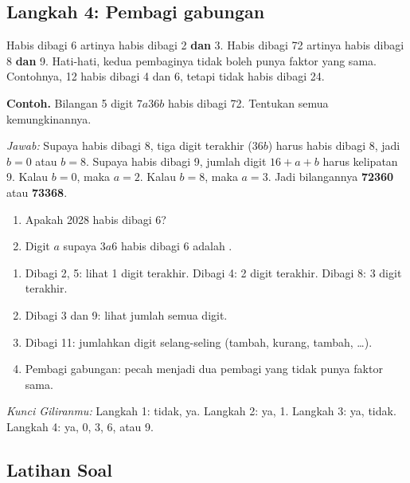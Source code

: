 \documentclass[11pt,a4paper]{article}
\begin{document}
\subsection*{Langkah 4: Pembagi gabungan}
Habis dibagi 6 artinya habis dibagi 2 \textbf{dan} 3. Habis dibagi 72 artinya habis dibagi 8
\textbf{dan} 9. Hati-hati, kedua pembaginya tidak boleh punya faktor yang sama. Contohnya, 12
habis dibagi 4 dan 6, tetapi tidak habis dibagi 24.

\begin{contoh}
\textbf{Contoh.} Bilangan 5 digit $7a36b$ habis dibagi 72. Tentukan semua kemungkinannya.

\textit{Jawab:} Supaya habis dibagi 8, tiga digit terakhir ($36b$) harus habis dibagi 8, jadi
$b = 0$ atau $b = 8$. Supaya habis dibagi 9, jumlah digit $16 + a + b$ harus kelipatan 9.
Kalau $b = 0$, maka $a = 2$. Kalau $b = 8$, maka $a = 3$. Jadi bilangannya \textbf{72360}
atau \textbf{73368}.
\end{contoh}

\begin{giliranmu}
\begin{enumerate}[label=\alph*.]
    \item Apakah 2028 habis dibagi 6? \kosong
    \item Digit $a$ supaya $3a6$ habis dibagi 6 adalah \kosong.
\end{enumerate}
\end{giliranmu}

\begin{rangkuman}
\begin{enumerate}
    \item Dibagi 2, 5: lihat 1 digit terakhir. Dibagi 4: 2 digit terakhir. Dibagi 8: 3 digit terakhir.
    \item Dibagi 3 dan 9: lihat jumlah semua digit.
    \item Dibagi 11: jumlahkan digit selang-seling (tambah, kurang, tambah, \dots).
    \item Pembagi gabungan: pecah menjadi dua pembagi yang tidak punya faktor sama.
\end{enumerate}
\end{rangkuman}

\textit{Kunci Giliranmu:} Langkah 1: tidak, ya. \quad Langkah 2: ya, 1. \quad Langkah 3: ya, tidak.
\quad Langkah 4: ya, 0, 3, 6, atau 9.

\newpage
\subsection*{Latihan Soal}
\end{document}
